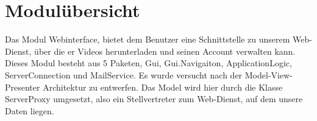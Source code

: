 \section{Modulübersicht}
Das Modul Webinterface, bietet dem Benutzer eine Schnittstelle zu unserem Web-Dienst, über die er Videos herunterladen und seinen Account verwalten kann. Dieses Modul besteht aus 5 Paketen, Gui, Gui.Navigaiton, ApplicationLogic, ServerConnection und MailService. Es wurde versucht nach der Model-View-Presenter Architektur zu entwerfen. Das Model wird hier durch die Klasse ServerProxy umgesetzt, also ein Stellvertreter zum Web-Dienst, auf dem unsere Daten liegen.
\newpage